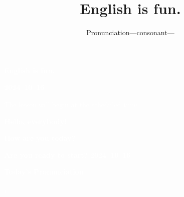 \documentclass[aspectratio=169,xcolor={dvipsnames,table}]{beamer}
\title{English is fun.}
\subtitle{Pronunciation---consonant---}
\author{}
\institute[]{}
\date[]
\begin{document}
\begin{frame}
\raggedleft
  \textcolor{white}{\Huge\bfseries English is fun.}

\vfill

\raggedleft
 \textcolor{white}{\LARGE\bfseries 2024--10--16}

\vfill
\vfill
\vfill

\raggedleft
\textcolor{white}{\large The lesson will begin at the scheduled time.}
\end{frame}
\begin{frame}
\raggedleft
  \textcolor{white}{\Huge\bfseries Hello, everybody!}

\vfill

\raggedleft
 \textcolor{white}{\Huge\bfseries How are you today?}
\vfill

\raggedleft
 \textcolor{white}{\Huge\bfseries Are you ready to start?}
\vfill
\vfill
\vfill
\raggedleft
 \textcolor{white}{\Large\bfseries 2024--10--16}
\hypertarget{top_page}{}
\hyperlink{today}{}
\end{frame}
\begin{frame}
\centering
  \textcolor{white}{\Huge\bfseries Today's Pronunciation}\pause

 \vspace{30pt}

  \textcolor{white}{\Huge\bfseries {}, }
\end{frame}
\end{document}
